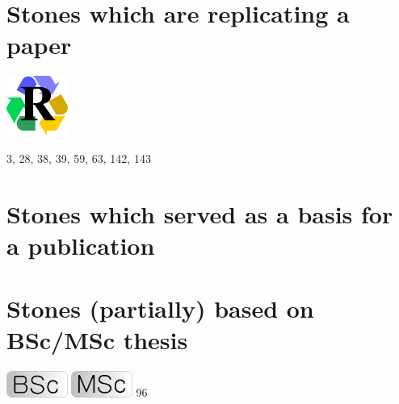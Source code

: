 \documentclass[a4paper,11pt]{report}
\begin{document}
\section{
Stones which are replicating a paper}

\includegraphics[width=2cm]{images/pictograms/replication}

3, 28, 38, 39, 59, 63, 142, 143

\section{
Stones which served as a basis for a publication}



\section{
Stones (partially) based on BSc/MSc thesis}

\includegraphics[width=2cm]{images/pictograms/bsc}
\includegraphics[width=2cm]{images/pictograms/msc}
96






\printbibliography

\newpage
{}
\end{document}

